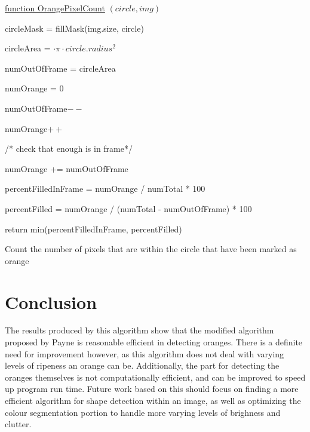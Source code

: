 \documentclass[conference]{IEEEtran}
\begin{document}
\begin{algorithm} 

    \underline{function OrangePixelCount} $(circle, img)$\;
    
        
    circleMask = fillMask(img.size, circle)
    
    circleArea = $  \cdot \pi \cdot circle.radius^2$
    
    numOutOfFrame = circleArea
   
    numOrange = 0
    
    
    {
   {
    numOutOfFrame$--$
    
    {
      numOrange$++$
    }
   }
    }
    
    /* check that enough is in frame*/
    
     {
  numOrange += numOutOfFrame
    }
    
    percentFilledInFrame = numOrange / numTotal * 100
    
    percentFilled = numOrange / (numTotal - numOutOfFrame) * 100
    
    return min(percentFilledInFrame, percentFilled)
    
    
    \caption{Count the number of pixels that are within the circle that have been marked as orange} \label{OrangeCountAlg}
\end{algorithm}


\section{Conclusion}

The results produced by this algorithm show that the modified algorithm proposed by Payne is reasonable efficient in detecting oranges. There is a definite need for improvement however, as this algorithm does not deal with varying levels of ripeness an orange can be. Additionally, the part for detecting the oranges themselves is not computationally efficient, and can be improved to speed up program run time. Future work based on this should focus on finding a more efficient algorithm for shape detection within an image, as well as optimizing the colour segmentation portion to handle more varying levels of brighness and clutter.









\vspace{12pt}
\end{document}
